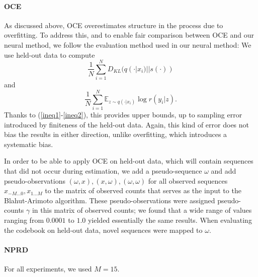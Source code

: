 \documentclass[11pt,letterpaper]{article}
\newcommand{\E}[0]{\mathbb{E}}
\newif \ifcomment
\newcommand\rljf[1]{\ifcomment{{\color{blue}(#1)}}\else{}\fi}
\begin{document}




\paragraph{OCE}
As discussed above, OCE overestimates structure in the process due to overfitting.
To address this, and to enable fair comparison between OCE and our neural method, we follow the evaluation method used in our neural method:
We use held-out data to compute \rljf{Describe these in prose too and what they mean}
$$\frac{1}{N} \sum_{i=1}^N D_{KL}(q(\cdot|x_i) || s(\cdot))$$ %
and
$$\frac{1}{N} \sum_{i=1}^N \E_{z \sim q(\cdot|x_i)} \log r(y_i|z).$$
Thanks to (\ref{ineq1}-\ref{ineq2}), this provides upper bounds, up to sampling error introduced by finiteness of the held-out data.
Again, this kind of error does not bias the results in either direction, unlike overfitting, which introduces a systematic bias.


In order to be able to apply OCE on held-out data, which will contain sequences that did not occur during estimation, we add a pseudo-sequence $\omega$ and add pseudo-observations $(\omega, x), (x, \omega), (\omega, \omega)$ for all observed sequences $x_{-M...0}, x_{1...M}$ to the matrix of observed counts that serves as the input to the Blahut-Arimoto algorithm.
These pseudo-observations were assigned pseudo-counts $\gamma$ in this matrix of observed counts; we found that a wide range of values ranging from $0.0001$ to $1.0$ yielded essentially the same results.
When evaluating the codebook on held-out data, novel sequences were mapped to $\omega$.




\paragraph{NPRD}
For all experiments, we used $M=15$.
\end{document}
